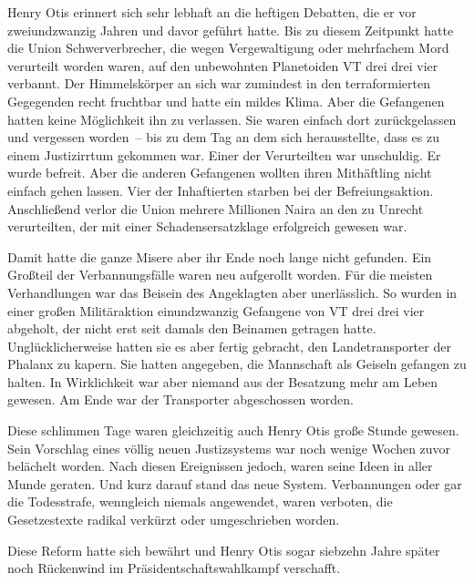 \par

Henry Otis erinnert sich sehr lebhaft an die heftigen Debatten, die er vor zweiundzwanzig Jahren und davor geführt hatte. Bis zu diesem Zeitpunkt hatte die Union Schwerverbrecher, die wegen Vergewaltigung oder mehrfachem Mord verurteilt worden waren, auf den unbewohnten Planetoiden VT drei drei vier verbannt. Der Himmelskörper an sich war zumindest in den terraformierten Gegegenden recht fruchtbar und hatte ein mildes Klima. Aber die Gefangenen hatten keine Möglichkeit ihn zu verlassen. Sie waren einfach dort zurückgelassen und vergessen worden~-- bis zu dem Tag an dem sich herausstellte, dass es zu einem Justizirrtum gekommen war. Einer der Verurteilten war unschuldig. Er wurde befreit. Aber die anderen Gefangenen wollten ihren Mithäftling nicht einfach gehen lassen. Vier der Inhaftierten starben bei der Befreiungsaktion. Anschließend verlor die Union mehrere Millionen Naira an den zu Unrecht verurteilten, der mit einer Schadensersatzklage erfolgreich gewesen war.

\par

Damit hatte die ganze Misere aber ihr Ende noch lange nicht gefunden. Ein Großteil der Verbannungsfälle waren neu aufgerollt worden. Für die meisten Verhandlungen war das Beisein des Angeklagten aber unerlässlich. So wurden in einer großen Militäraktion einundzwanzig Gefangene von VT drei drei vier abgeholt, der nicht erst seit damals den Beinamen  getragen hatte. Unglücklicherweise hatten sie es aber fertig gebracht, den Landetransporter der Phalanx zu kapern. Sie hatten angegeben, die Mannschaft als Geiseln gefangen zu halten. In Wirklichkeit war aber niemand aus der Besatzung mehr am Leben gewesen. Am Ende war der Transporter abgeschossen worden.

\par

Diese schlimmen Tage waren gleichzeitig auch Henry Otis große Stunde gewesen. Sein Vorschlag eines völlig neuen Justizsystems war noch wenige Wochen zuvor belächelt worden. Nach diesen Ereignissen jedoch, waren seine Ideen in aller Munde geraten. Und kurz darauf stand das neue System. Verbannungen oder gar die Todesstrafe, wenngleich niemals angewendet, waren verboten, die Gesetzestexte radikal verkürzt oder umgeschrieben worden.

\par

Diese Reform hatte sich bewährt und Henry Otis sogar siebzehn Jahre später noch Rückenwind im Präsidentschaftswahlkampf verschafft.

